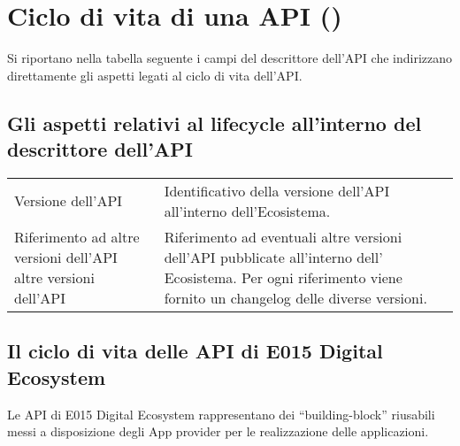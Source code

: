 \documentclass[letterpaper,10pt,italian]{sphinxmanual}
\begin{document}
\section{Ciclo di vita di una API  ()}
\label{\detokenize{sez27:ciclo-di-vita-di-una-api-api-lifecycle}}\label{\detokenize{sez27::doc}}\label{\detokenize{sez27:sezione27}}


Si riportano nella tabella seguente i campi del descrittore dell’API che indirizzano direttamente gli aspetti legati al ciclo di vita dell’API.


\subsection{Gli aspetti relativi al lifecycle all’interno del descrittore dell’API}
\label{\detokenize{sez27:gli-aspetti-relativi-al-lifecycle-allinterno-del-descrittore-dell-api}}\label{\detokenize{sez27:sezione271}}

\begin{savenotes}\sphinxattablestart
\centering
{}
\label{\detokenize{sez27:id1}}
\sphinxaftercaption
\begin{tabulary}{\linewidth}[t]{|T|T|}
\hline
{}\relax &\relax \\
\hline
Versione dell’API
&
Identificativo della versione dell’API all’interno dell’Ecosistema.
\\
\hline
Riferimento ad altre versioni dell’API altre versioni dell’API
&
Riferimento ad eventuali altre versioni dell’API pubblicate all’interno dell’ Ecosistema. Per ogni riferimento viene fornito un changelog delle diverse versioni.
\\
\hline
\end{tabulary}
\par
\sphinxattableend\end{savenotes}


\subsection{Il ciclo di vita delle API di E015 Digital Ecosystem}
\label{\detokenize{sez27:sezione272}}\label{\detokenize{sez27:il-ciclo-di-vita-delle-api-di-e015-digital-ecosystem}}
Le API di E015 Digital Ecosystem rappresentano dei “building-block” riusabili messi a disposizione degli App provider per le realizzazione delle applicazioni.
\end{document}
